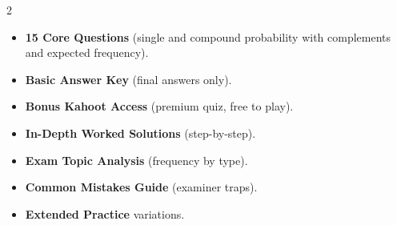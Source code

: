 \documentclass[11pt,a4paper]{article}
\newcommand{\FullReleaseDate}{April 30, 2026}
\begin{document}
\vspace{8pt}

\begin{multicols}{2}
  \begin{tcolorbox}[card, title=\sffamily\bfseries\textcolor{white}{\faHandPointDown\ TODAY (Simplified Version)}, colbacktitle=mainblue, boxed title style={sharp corners, boxrule=0pt}]
    \begin{itemize}[leftmargin=1.2em, itemsep=2pt]
      \item \small \textbf{15 Core Questions} (single and compound probability with complements and expected frequency).
      \item \small \textbf{Basic Answer Key} (final answers only).
      \item \small \textbf{Bonus Kahoot Access} (premium quiz, free to play).
    \end{itemize}
  \end{tcolorbox}

  \columnbreak

  \begin{tcolorbox}[card, title=\sffamily\bfseries\textcolor{white}{\faRocket\ ON \FullReleaseDate\ (Full Upgrade)}, colbacktitle=mainblue, boxed title style={sharp corners, boxrule=0pt}]
    \begin{itemize}[leftmargin=1.2em, itemsep=2pt]
      \item \small \textbf{In-Depth Worked Solutions} (step-by-step).
      \item \small \textbf{Exam Topic Analysis} (frequency by type).
      \item \small \textbf{Common Mistakes Guide} (examiner traps).
      \item \small \textbf{Extended Practice} variations.
    \end{itemize}
  \end{tcolorbox}
\end{multicols}
\end{document}
